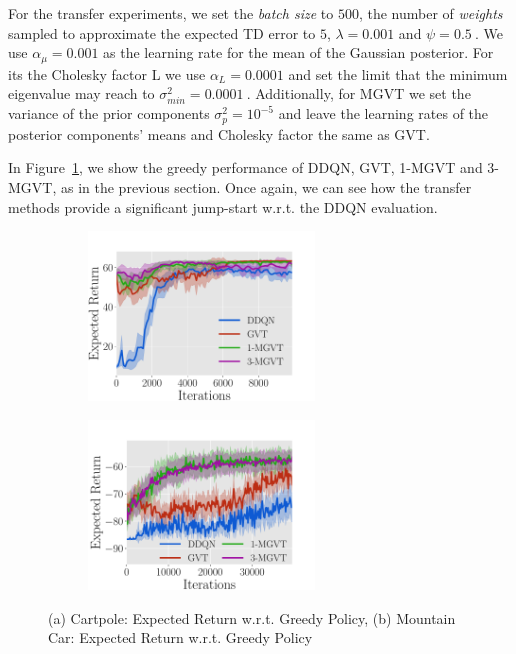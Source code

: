 \documentclass{article}
\begin{document}
For the transfer experiments, we set the \textit{batch size} to $500$, the number of \textit{weights} sampled to approximate the expected TD error to $5$, $\lambda=0.001$ and $\psi=0.5\ $. We use $\alpha_{\mu}=0.001$ as the learning rate for the mean of the Gaussian posterior. For its the Cholesky factor L we use $\alpha_L=0.0001$ and set the limit that the minimum eigenvalue may reach to $\sigma_{min}^2=0.0001\ $. Additionally, for MGVT we set the variance of the prior components $\sigma_p^2=10^{-5}$ and leave the learning rates of the posterior components' means and Cholesky factor the same as GVT.

In Figure~\ref{fig:cp-erew}, we show the greedy performance of DDQN, GVT, 1-MGVT and 3-MGVT, as in the previous section. Once again, we can see how the transfer methods provide a significant jump-start w.r.t. the DDQN evaluation.

\begin{figure}[t]
  \begin{subfigure}[b]{0.45\textwidth}
    \includegraphics[trim=0.0cm 0cm 1.8cm 1.3cm,clip=true,height=4.5cm]{images/cartpole/erew.pdf}
    \caption{}
    \label{fig:cp-erew}
  \end{subfigure}
  \begin{subfigure}[b]{0.45\textwidth}
    \includegraphics[trim=0.0cm 0cm 1.8cm 1.3cm,clip=true,height=4.5cm]{images/mountaincar/erew.pdf}
    \caption{}
    \label{fig:mc-erew}
  \end{subfigure}
  \caption{(a) Cartpole: Expected Return w.r.t. Greedy Policy, (b) Mountain Car: Expected Return w.r.t. Greedy Policy}
  \label{fig:ccerew}
\end{figure}
\end{document}
